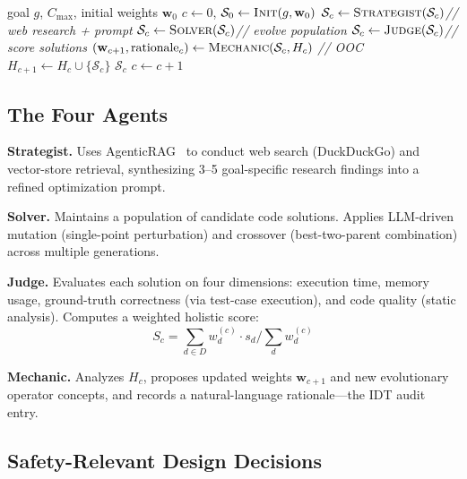 \documentclass[letterpaper]{article}
\begin{document}
\begin{algorithm}
\caption{AdaptEvolve-MAS Cyclic Evolution}
\label{alg:main}
\begin{algorithmic}[1]
\REQUIRE goal $g$, $C_{\max}$, initial weights $\mathbf{w}_0$
\STATE $c \gets 0$,\; $\mathcal{S}_0 \gets \textsc{Init}(g, \mathbf{w}_0)$
  \STATE $\mathcal{S}_c \gets \textsc{Strategist}(\mathcal{S}_c)$\hfill\textit{// web research + prompt}
  \STATE $\mathcal{S}_c \gets \textsc{Solver}(\mathcal{S}_c)$\hfill\textit{// evolve population}
  \STATE $\mathcal{S}_c \gets \textsc{Judge}(\mathcal{S}_c)$\hfill\textit{// score solutions}
  \STATE $(\mathbf{w}_{c+1}, \text{rationale}_c) \gets \textsc{Mechanic}(\mathcal{S}_c, H_c)$ \hfill\textit{// OOC}
  \STATE $H_{c+1} \gets H_c \cup \{\mathcal{S}_c\}$
    \RETURN $\mathcal{S}_c$
  \ENDIF
  \STATE $c \gets c + 1$
\ENDWHILE
\end{algorithmic}
\end{algorithm}

\subsection{The Four Agents}

\textbf{Strategist.} Uses AgenticRAG~\cite{lewis2020rag} to conduct
web search (DuckDuckGo) and vector-store retrieval, synthesizing 3--5
goal-specific research findings into a refined optimization prompt.

\textbf{Solver.} Maintains a population of candidate code solutions.
Applies LLM-driven mutation (single-point perturbation) and crossover
(best-two-parent combination) across multiple generations.

\textbf{Judge.} Evaluates each solution on four dimensions: execution
time, memory usage, ground-truth correctness (via test-case execution),
and code quality (static analysis).  Computes a weighted holistic score:
\[
  S_c = \sum_{d \in D} w_d^{(c)} \cdot s_d \Big/ \sum_{d} w_d^{(c)}
\]

\textbf{Mechanic.} Analyzes $H_c$, proposes updated weights
$\mathbf{w}_{c+1}$ and new evolutionary operator concepts, and
records a natural-language rationale---the IDT audit entry.

\subsection{Safety-Relevant Design Decisions}
\end{document}
